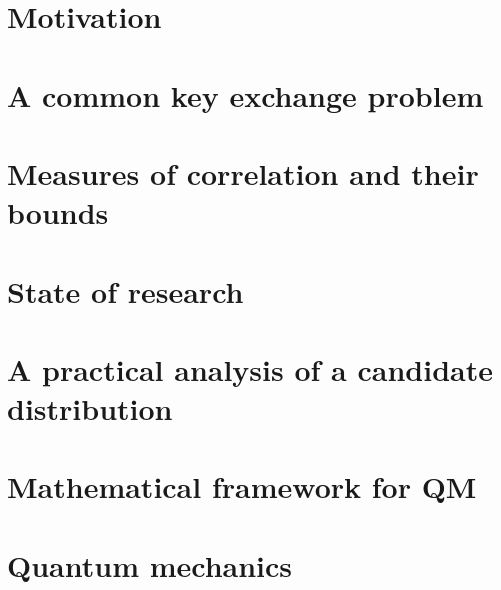 \documentclass[titlepage]{report}
\theoremstyle{remark}
\begin{document}



\tableofcontents

%

\chapter{Motivation}

		
 \chapter{A common key exchange problem}
 
%
\chapter{Measures of correlation and their bounds}

 \chapter{State of research}
 
 \chapter{A practical analysis of a candidate distribution}
 
% 

\begin{appendices}
	\chapter{Mathematical framework for QM}
	
	\chapter{Quantum mechanics}
	
\end{appendices}

%
\printbibliography
\end{document}
